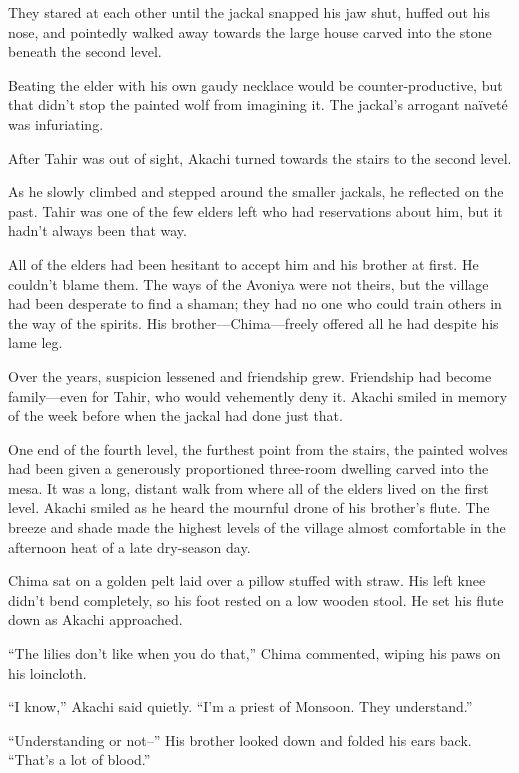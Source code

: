 They stared at each other until the jackal snapped his jaw shut, huffed out his nose, and pointedly walked away towards the large house carved into the stone beneath the second level.

Beating the elder with his own gaudy necklace would be counter-productive, but that didn't stop the painted wolf from imagining it. The jackal's arrogant naïveté was infuriating.

After Tahir was out of sight, Akachi turned towards the stairs to the second level.

\secdiv

\noindent As he slowly climbed and stepped around the smaller jackals, he reflected on the past. Tahir was one of the few elders left who had reservations about him, but it hadn't always been that way.

All of the elders had been hesitant to accept him and his brother at first. He couldn't blame them. The ways of the Avoniya were not theirs, but the village had been desperate to find a shaman; they had no one who could train others in the way of the spirits. His brother---Chima---freely offered all he had despite his lame leg.

Over the years, suspicion lessened and friendship grew. Friendship had become family---even for Tahir, who would vehemently deny it. Akachi smiled in memory of the week before when the jackal had done just that.

\secdiv

\noindent One end of the fourth level, the furthest point from the stairs, the painted wolves had been given a generously proportioned three-room dwelling carved into the mesa. It was a long, distant walk from where all of the elders lived on the first level. Akachi smiled as he heard the mournful drone of his brother's flute. The breeze and shade made the highest levels of the village almost comfortable in the afternoon heat of a late dry-season day.

Chima sat on a golden pelt laid over a pillow stuffed with straw. His left knee didn't bend completely, so his foot rested on a low wooden stool. He set his flute down as Akachi approached. 

``The lilies don't like when you do that,'' Chima commented, wiping his paws on his loincloth. 

``I know,'' Akachi said quietly. ``I'm a priest of Monsoon. They understand.''

``Understanding or not--'' His brother looked down and folded his ears back. ``That's a lot of blood.''


